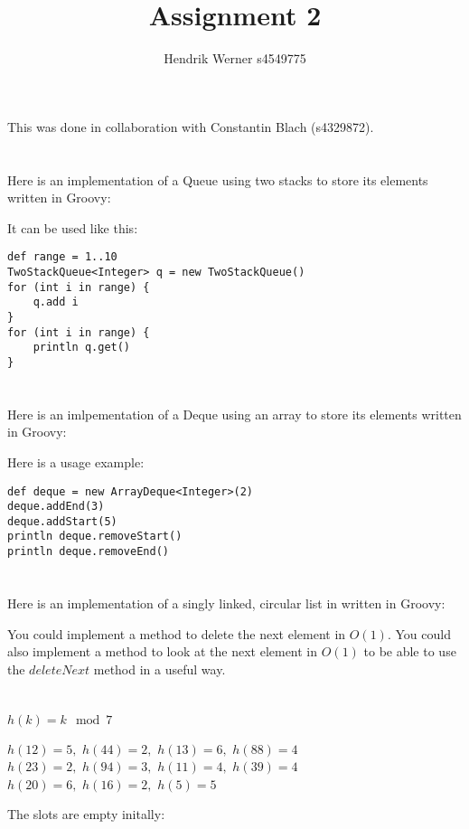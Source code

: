 \documentclass[12pt]{article}
\title {Assignment 2}
\author {Hendrik Werner s4549775}
\begin{document}
\maketitle

This was done in collaboration with Constantin Blach (s4329872).

\section{} %
Here is an implementation of a Queue using two stacks to store its elements written in Groovy:



It can be used like this:

\begin{lstlisting}
def range = 1..10
TwoStackQueue<Integer> q = new TwoStackQueue()
for (int i in range) {
    q.add i
}
for (int i in range) {
    println q.get()
}
\end{lstlisting}

\section{} %
Here is an imlpementation of a Deque using an array to store its elements written in Groovy:



Here is a usage example:

\begin{lstlisting}
def deque = new ArrayDeque<Integer>(2)
deque.addEnd(3)
deque.addStart(5)
println deque.removeStart()
println deque.removeEnd()
\end{lstlisting}

\section{} %
Here is an implementation of a singly linked, circular list in written in Groovy:



You could implement a method to delete the next element in $O(1)$. You could also implement a method to look at the next element in $O(1)$ to be able to use the $deleteNext$ method in a useful way.

\section{} %
\section{} %
\section{} %
$h(k) = k \mod 7$

$h(12) = 5,$ $h(44) = 2,$ $h(13) = 6,$ $h(88) = 4$\\
$h(23) = 2,$ $h(94) = 3,$ $h(11) = 4,$ $h(39) = 4$\\
$h(20) = 6,$ $h(16) = 2,$ $h(5) = 5$

The slots are empty initally:
\begin{tabular}{|c|c|c|c|c|c|c|}
	\hline
	&&&&&&\\
	\hline
\end{tabular}
\end{document}

